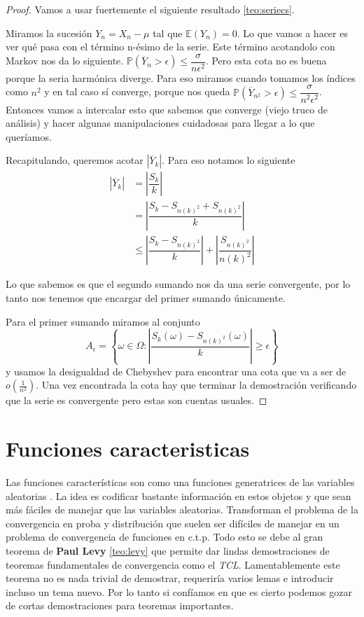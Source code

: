 \documentclass[11pt]{article}
\theoremstyle{plain} %
\theoremstyle{definition}
\theoremstyle{remark}
\def\Om{\Omega}
\def\E{\mathbb{E}}
\def\P{\mathbb{P}}
\def\vas{variables aleatorias }
\begin{document}
\begin{proof}
	Vamos a usar fuertemente el siguiente resultado \ref{teo:seriecs}.
	
	Miramos la sucesión $Y_n = X_n - \mu$ tal que $\E(Y_n) = 0$. Lo que vamos a hacer es ver qué pasa con el término n-ésimo de la serie. Este término acotandolo con Markov nos da lo siguiente.
	$\P(\overline{Y}_{n} > \epsilon) \leq \dfrac{\sigma}{n\epsilon^2}$. Pero esta cota no es buena porque la seria harmónica diverge. Para eso miramos cuando tomamos los índices como $n^2$ y en tal caso sí converge, porque nos queda $\P(\overline{Y}_{n^2} > \epsilon) \leq \dfrac{\sigma}{n^2\epsilon^2}$. Entonces vamos a intercalar esto que sabemos que converge (viejo truco de análisis) y hacer algunas manipulaciones cuidadosas para llegar a lo que queríamos.
	
	Recapitulando, queremos acotar $|\overline{Y}_{k}|$. Para eso notamos lo siguiente 
	\begin{align*}
		\left|\overline{Y}_{k}\right|  &= \left| \dfrac{S_k}{k}\right|  \\
		&= \left| \dfrac{S_k - S_{n(k)^2} + S_{n(k)^2}}{k}\right| \\
		& \leq \left| \dfrac{S_k - S_{n(k)^2}}{k}\right|  + \left|  \dfrac{S_{n(k)^2}}{n(k)^2}\right| 
	\end{align*}	
	
Lo que sabemos es que el segundo sumando nos da una serie convergente, por lo tanto nos tenemos que encargar del primer sumando únicamente.

Para el primer sumando miramos al conjunto 
\[
A_{\epsilon} =  \left\lbrace \omega \in \Om : \left| \dfrac{S_k (\omega) - S_{n(k)^2}(\omega)}{k} \right| \geq \epsilon \right\rbrace 
\] y usamos la desigualdad de Chebyshev para encontrar una cota que va a ser de $o(\frac{1}{n^2})$. Una vez encontrada la cota hay que terminar la demostración verificando que la serie es convergente pero estas son cuentas usuales.
 
\end{proof}

\bigskip
\section{Funciones caracteristicas}

Las funciones características son como una funciones generatrices de las \vas. La idea es codificar bastante información en estos objetos y que sean más fáciles de manejar que las variables aleatorias. Transforman el problema de la convergencia en proba y distribución que suelen ser difíciles de manejar en un problema de convergencia de funciones en c.t.p. Todo esto se debe al gran teorema de \textbf{Paul Levy} \ref{teo:levy} que permite dar lindas demostraciones de teoremas fundamentales de convergencia como el \textit{TCL}. Lamentablemente este teorema no es nada trivial de demostrar, requeriría varios lemas e introducir incluso un tema nuevo. Por lo tanto si confíamos en que es cierto podemos gozar de cortas demostraciones para teoremas importantes.
\end{document}
